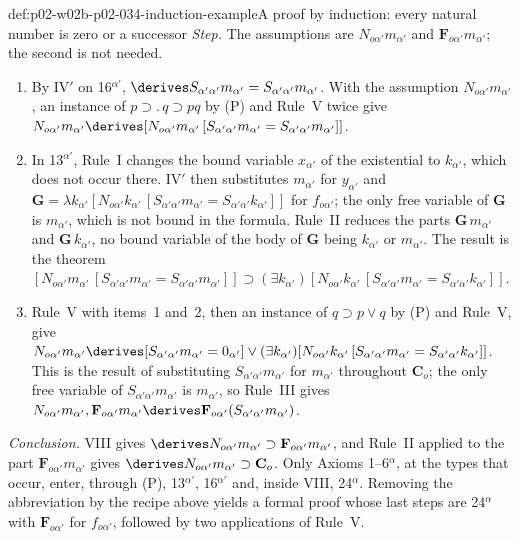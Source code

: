 \begin{hbexample}{def:p02-w02b-p02-034-induction-example}{A proof by induction: every natural number is zero or a successor}
\emph{Step.}  The assumptions are \(N_{o\alpha'}m_{\alpha'}\) and
\(\mathbf F_{o\alpha'}m_{\alpha'}\); the second is not needed.
\begin{enumerate}
 \item By IV\('\) on 16\(^{\alpha'}\),
   \(\derives S_{\alpha'\alpha'}m_{\alpha'}=S_{\alpha'\alpha'}m_{\alpha'}\).
   With the assumption \(N_{o\alpha'}m_{\alpha'}\), an instance of
   \(p\supset.\,q\supset pq\) by (P) and Rule~V twice give
   \(N_{o\alpha'}m_{\alpha'}\derives[N_{o\alpha'}m_{\alpha'}\,[S_{\alpha'\alpha'}m_{\alpha'}=S_{\alpha'\alpha'}m_{\alpha'}]]\).
 \item In 13\(^{\alpha'}\), Rule~I changes the bound variable
   \(x_{\alpha'}\) of the existential to \(k_{\alpha'}\), which does not occur
   there.  IV\('\) then substitutes \(m_{\alpha'}\) for \(y_{\alpha'}\) and
   \(\mathbf G=\lambda k_{\alpha'}[N_{o\alpha'}k_{\alpha'}\,[S_{\alpha'\alpha'}m_{\alpha'}=S_{\alpha'\alpha'}k_{\alpha'}]]\)
   for \(f_{o\alpha'}\); the only free variable of \(\mathbf G\) is
   \(m_{\alpha'}\), which is not bound in the formula.  Rule~II reduces
   the parts \(\mathbf G\,m_{\alpha'}\) and \(\mathbf G\,k_{\alpha'}\), no
   bound variable of the body of \(\mathbf G\) being \(k_{\alpha'}\) or
   \(m_{\alpha'}\).  The result is the theorem
   \([N_{o\alpha'}m_{\alpha'}\,[S_{\alpha'\alpha'}m_{\alpha'}=S_{\alpha'\alpha'}m_{\alpha'}]]\supset
   (\exists k_{\alpha'})[N_{o\alpha'}k_{\alpha'}\,[S_{\alpha'\alpha'}m_{\alpha'}=S_{\alpha'\alpha'}k_{\alpha'}]]\).
 \item Rule~V with items~1 and~2, then an instance of
   \(q\supset p\vee q\) by (P) and Rule~V, give
   \(N_{o\alpha'}m_{\alpha'}\derives[S_{\alpha'\alpha'}m_{\alpha'}=0_{\alpha'}]\vee(\exists k_{\alpha'})[N_{o\alpha'}k_{\alpha'}\,[S_{\alpha'\alpha'}m_{\alpha'}=S_{\alpha'\alpha'}k_{\alpha'}]]\).
   This is the result of substituting \(S_{\alpha'\alpha'}m_{\alpha'}\) for
   \(m_{\alpha'}\) throughout \(\mathbf C_o\); the only free variable of
   \(S_{\alpha'\alpha'}m_{\alpha'}\) is \(m_{\alpha'}\), so Rule~III gives
   \(N_{o\alpha'}m_{\alpha'},\mathbf F_{o\alpha'}m_{\alpha'}\derives\mathbf F_{o\alpha'}(S_{\alpha'\alpha'}m_{\alpha'})\).
\end{enumerate}

\emph{Conclusion.}  VIII gives
\(\derives N_{o\alpha'}m_{\alpha'}\supset\mathbf F_{o\alpha'}m_{\alpha'}\), and
Rule~II applied to the part \(\mathbf F_{o\alpha'}m_{\alpha'}\) gives
\(\derives N_{o\alpha'}m_{\alpha'}\supset\mathbf C_o\).  Only Axioms
1--6\(^\alpha\), at the types that occur, enter, through (P),
13\(^{\alpha'}\), 16\(^{\alpha'}\) and, inside VIII, 24\(^\alpha\).  Removing the abbreviation
by the recipe above yields a formal proof whose last steps are
24\(^\alpha\) with \(\mathbf F_{o\alpha'}\) for \(f_{o\alpha'}\), followed by
two applications of Rule~V.
\end{hbexample}

